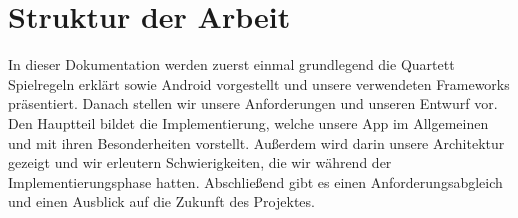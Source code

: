 \section{Struktur der Arbeit}
\label{sec:einleitung:struktur}

In dieser Dokumentation werden zuerst einmal grundlegend die Quartett Spielregeln erklärt sowie Android vorgestellt und unsere verwendeten Frameworks präsentiert. Danach stellen wir unsere Anforderungen und unseren Entwurf vor. Den Hauptteil bildet die Implementierung, welche unsere App im Allgemeinen und mit ihren Besonderheiten vorstellt. Außerdem wird darin unsere Architektur gezeigt und wir erleutern Schwierigkeiten, die wir während der Implementierungsphase hatten. Abschließend gibt es einen Anforderungsabgleich und einen Ausblick auf die Zukunft des Projektes.
